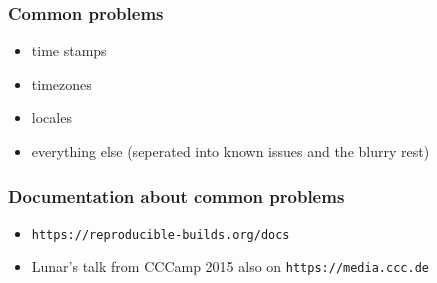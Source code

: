 \documentclass[14pt]{beamer}
\newif\ifplacelogo
\begin{document}
\begin{frame}
 \frametitle{Common problems}

 \begin{itemize}
  \item time stamps
  \item<2-3> timezones
  \item<2-3> locales
  \item<3> everything else (seperated into known issues and the blurry rest)
 \end{itemize}
\end{frame}

\begin{frame}
 \frametitle{Documentation about common problems}
 \begin{itemize}
  \item \texttt{https://reproducible-builds.org/docs}
  \item Lunar's talk from CCCamp 2015 also on
  \texttt{https://media.ccc.de}
 \end{itemize}
\end{frame}



\placelogofalse
\end{document}
